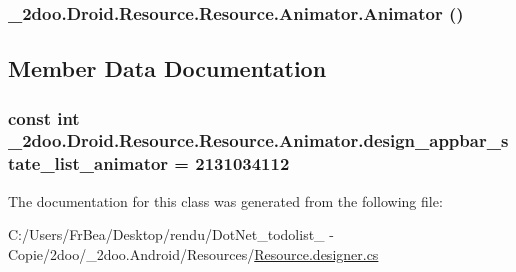 \hypertarget{class__2doo_1_1_droid_1_1_resource_1_1_animator_7904bf1e47d819f43fd75909358cf03e}{
\subsubsection[{Animator}]{\setlength{\rightskip}{0pt plus 5cm}\_\-2doo.Droid.Resource.Resource.Animator.Animator ()}}
\label{class__2doo_1_1_droid_1_1_resource_1_1_animator_7904bf1e47d819f43fd75909358cf03e}




\subsection{Member Data Documentation}
\hypertarget{class__2doo_1_1_droid_1_1_resource_1_1_animator_b8a7171c0d2de1c76bbb34de63c86ade}{
\subsubsection[{design\_\-appbar\_\-state\_\-list\_\-animator}]{\setlength{\rightskip}{0pt plus 5cm}const int \_\-2doo.Droid.Resource.Resource.Animator.design\_\-appbar\_\-state\_\-list\_\-animator = 2131034112}}
\label{class__2doo_1_1_droid_1_1_resource_1_1_animator_b8a7171c0d2de1c76bbb34de63c86ade}




The documentation for this class was generated from the following file:\begin{CompactItemize}
\item 
C:/Users/FrBea/Desktop/rendu/DotNet\_\-todolist\_ - Copie/2doo/\_\-2doo.Android/Resources/\hyperlink{_resource_8designer_8cs}{Resource.designer.cs}\end{CompactItemize}
